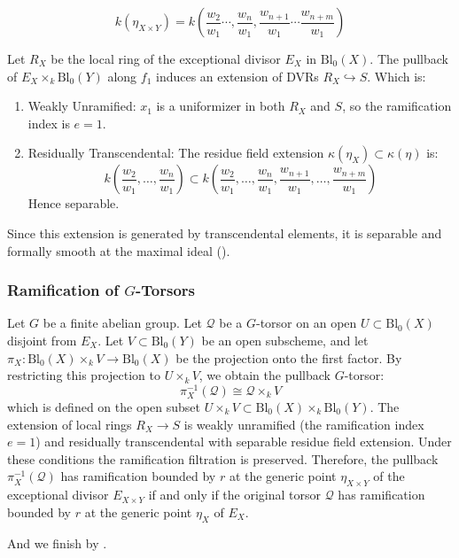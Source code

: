 $$k(\eta_{X \times Y}) = k\left(\frac{w_2}{w_1} \cdots, \frac{w_n}{w_1}, \frac{w_{n+1}}{w_1} \cdots \frac{w_{n+m}}{w_1}\right)$$

Let $R_X$ be the local ring of the exceptional divisor $E_X$ in $\text{Bl}_0(X)$.
The pullback of $E_X \times_k \text{Bl}_0(Y)$ along $f_1$ induces an extension of DVRs $R_X \hookrightarrow S$. Which is:
\begin{enumerate}
    \item Weakly Unramified: $x_1$ is a uniformizer in both $R_X$ and $S$, so the ramification index is $e=1$.
    \item Residually Transcendental: The residue field extension $\kappa(\eta_X) \subset \kappa(\eta)$ is:
    $$k\left(\frac{w_2}{w_1}, \dots, \frac{w_n}{w_1}\right) \subset k\left(\frac{w_2}{w_1}, \dots, \frac{w_n}{w_1}, \frac{w_{n+1}}{w_1}, \dots, \frac{w_{n+m}}{w_1}\right)$$
    Hence separable.
\end{enumerate}
Since this extension is generated by transcendental elements, it is separable and formally smooth at the maximal ideal ().

\subsubsection*{Ramification of $G$-Torsors}
Let $G$ be a finite abelian group.
Let $\mathcal{Q}$ be a $G$-torsor on an open $U \subset \text{Bl}_0(X)$ disjoint from $E_X$.
Let $V \subset \text{Bl}_0(Y)$ be an open subscheme, and let $\pi_X: \text{Bl}_0(X) \times_k V \to \text{Bl}_0(X)$
be the projection onto the first factor.
By restricting this projection to $U \times_k V$, we obtain the pullback $G$-torsor:
$$\pi_X^{-1}(\mathcal{Q}) \cong \mathcal{Q} \times_k V$$
which is defined on the open subset $U \times_k V \subset \text{Bl}_0(X) \times_k \text{Bl}_0(Y)$.
The extension of local rings $R_X \to S$ is weakly unramified (the ramification index $e=1$) and residually transcendental with separable residue field extension.
Under these conditions the ramification filtration is preserved.
Therefore, the pullback $\pi_X^{-1}(\mathcal{Q})$ has ramification bounded by $r$ at the generic point $\eta_{X \times Y}$ of the exceptional divisor $E_{X \times Y}$ if and only if
the original torsor $\mathcal{Q}$ has ramification bounded by $r$ at the generic point $\eta_X$ of $E_X$.

And we finish by .


